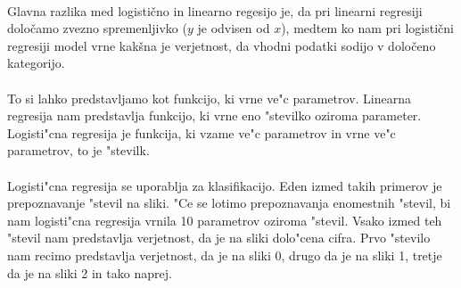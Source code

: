 \paragraph{}
Glavna razlika med logistično in linearno regesijo je, da pri linearni regresiji določamo zvezno spremenljivko ($y$ je odvisen od $x$), medtem ko nam pri logistični regresiji model vrne kakšna je verjetnost, da vhodni podatki sodijo v določeno kategorijo.

\paragraph{}
To si lahko predstavljamo kot funkcijo, ki vrne ve"c parametrov. Linearna regresija nam predstavlja funkcijo, ki vrne eno "stevilko oziroma parameter. Logisti"cna regresija je funkcija, ki vzame ve"c parametrov in vrne ve"c parametrov, to je "stevilk.

\paragraph{}
Logisti"cna regresija se uporablja za klasifikacijo. Eden izmed takih primerov je prepoznavanje "stevil na sliki. "Ce se lotimo prepoznavanja enomestnih "stevil, bi nam logisti"cna regresija vrnila 10 parametrov oziroma "stevil. Vsako izmed teh "stevil nam predstavlja verjetnost, da je na sliki dolo"cena cifra. Prvo "stevilo nam recimo predstavlja verjetnost, da je na sliki 0, drugo da je na sliki 1, tretje da je na sliki 2 in tako naprej.
